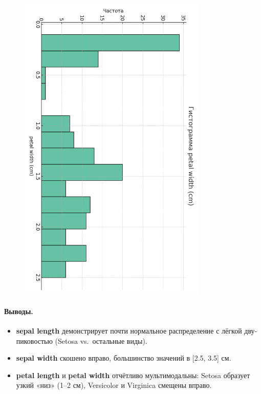 \begin{figure}[H]
  \includegraphics[width=0.8\textwidth]{images/histo_petal_width_cm_cb2.png}
\end{figure}

\paragraph{Выводы.}
\begin{itemize}
  \item \textbf{sepal length} демонстрирует почти нормальное распределение с лёгкой дву­пиковостью (Setosa vs.~остальные виды).
  \item \textbf{sepal width} скошено вправо, большинство значений в [2.5, 3.5] см.
  \item \textbf{petal length} и \textbf{petal width} отчётливо мультимодальны: Setosa образует узкий «низ» (1–2 см), Versicolor и Virginica смещены вправо.
\end{itemize}

